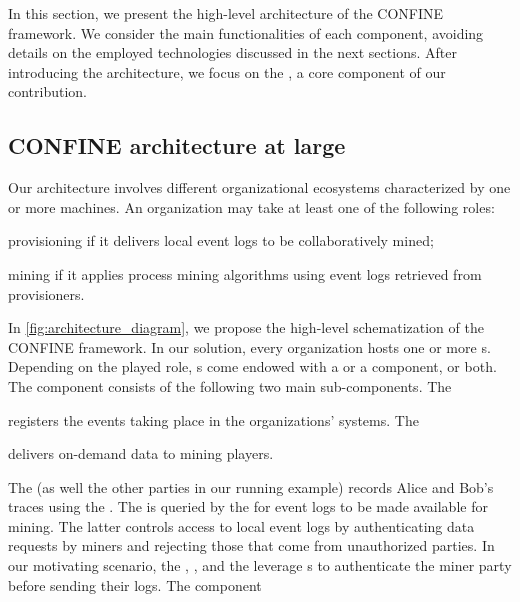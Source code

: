 
In this section, we present the high-level architecture of the CONFINE framework. We consider the main functionalities of each component, avoiding details on the employed technologies discussed in the next sections. After introducing the architecture, we focus on the , a core component of our contribution.

\subsection{CONFINE architecture at large}
Our architecture involves different organizational ecosystems characterized by one or more machines. An organization may take at least one of the following roles: 
\begin{inparadesc}
\item[provisioning] if it delivers local event logs to be collaboratively mined;
\item[mining] if it applies process mining algorithms using event logs retrieved from provisioners.
\end{inparadesc}
In \cref{fig:architecture_diagram}, we propose the high-level schematization of the CONFINE framework.
In our solution, every organization hosts one or more s. Depending on the played role, s come endowed with a  or a  component, or both. The  component consists of the following two main sub-components. The \begin{inparadesc}
\item[\Compo{Log Recorder}] registers the events taking place in the organizations' systems. The
\item[\Compo{Log Provider}] delivers on-demand data to mining players.
\end{inparadesc}
The  (as well the other parties in our running example) records Alice and Bob's traces using the . The  is queried by the  for event logs to be made available for mining. The latter controls access to local event logs by authenticating data requests by miners and rejecting those that come from unauthorized parties.
In our motivating scenario, the , , and the  leverage s to authenticate the miner party before sending their logs.  The  component

